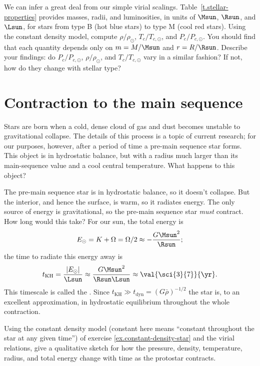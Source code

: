 \begin{exercisebox}\label{ex.stellar-properties}
We can infer a great deal from our simple virial scalings. Table~\ref{t.stellar-properties} provides masses, radii, and luminosities, in units of $\Msun$, $\Rsun$, and $\Lsun$, for stars from type B (hot blue stars) to type M (cool red stars).  
Using the constant density model, compute $\rho/\rho_{\odot}$, $T_{c}/T_{c,\odot}$, and $P_{c}/P_{c,\odot}$. You should find that each quantity depends only on $m=M/\Msun$ and $r=R/\Rsun$. Describe your findings: do $P_{c}/P_{c,\odot}$, $\rho/\rho_{\odot}$, and $T_{c}/T_{c,\odot}$ vary in a similar fashion? If not, how do they change with stellar type?
\end{exercisebox}

\section{Contraction to the main sequence}
\label{s.stellar-contraction}

Stars are born when a cold, dense cloud of gas and dust becomes unstable to gravitational collapse. The details of this process is a topic of current research; for our purposes, however, after a period of time a pre-main sequence star forms.  This object is in hydrostatic balance, but with a radius much larger than its main-sequence value and a cool central temperature. What happens to this object?

The pre-main sequence star is in hydrostatic balance, so it doesn't collapse. But the interior, and hence the surface, is warm, so it radiates energy.  The only source of energy is gravitational, so the pre-main sequence star \emph{must} contract.  How long would this take?  For our sun, the total energy is
\[
	E_{\odot} = K + \Omega = \Omega/2 \approx -\frac{G\Msun^{2}}{\Rsun};
\]
the time to radiate this energy away is
\begin{equation}\label{e.kelvin-helmholtz}
t_{\mathrm{KH}} = \frac{|E_{\odot}|}{\Lsun} \approx \frac{G\Msun^{2}}{\Rsun\Lsun} \approx \val{\sci{3}{7}}{\yr}.
\end{equation}
This timescale is called the .  Since $t_{\mathrm{KH}} \gg t_{\mathrm{dyn}} = (G\bar{\rho})^{-1/2}$ the star is, to an excellent approximation, in hydrostatic equilibrium throughout the whole contraction.

\begin{exercisebox}
\label{ex.contraction-constant-density-protostar}
Using the constant density model (constant here means ``constant throughout the star at any given time'') of exercise \ref{ex.constant-density-star} and the virial relations, give a qualitative sketch for how the pressure, density, temperature, radius, and total energy change with time as the protostar contracts.
\end{exercisebox}

